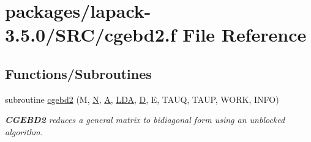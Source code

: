 \hypertarget{cgebd2_8f}{}\section{packages/lapack-\/3.5.0/\+S\+R\+C/cgebd2.f File Reference}
\label{cgebd2_8f}
\subsection*{Functions/\+Subroutines}
\begin{DoxyCompactItemize}
\item 
subroutine \hyperlink{group__complexGEcomputational_ga3066386c9875ffe61cb0f8299012360a}{cgebd2} (M, \hyperlink{polmisc_8c_a0240ac851181b84ac374872dc5434ee4}{N}, \hyperlink{classA}{A}, \hyperlink{example__user_8c_ae946da542ce0db94dced19b2ecefd1aa}{L\+D\+A}, \hyperlink{odrpack_8h_a7dae6ea403d00f3687f24a874e67d139}{D}, E, T\+A\+U\+Q, T\+A\+U\+P, W\+O\+R\+K, I\+N\+F\+O)
\begin{DoxyCompactList}\small\item\em {\bfseries C\+G\+E\+B\+D2} reduces a general matrix to bidiagonal form using an unblocked algorithm. \end{DoxyCompactList}\end{DoxyCompactItemize}
